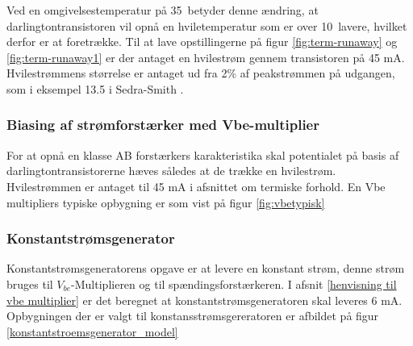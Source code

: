 Ved en omgivelsestemperatur på 35~\celsius betyder denne ændring, at darlingtontransistoren vil opnå en hviletemperatur som er over 10~\celsius lavere, hvilket derfor er at foretrække. Til at lave opstillingerne på figur \ref{fig:term-runaway} og \ref{fig:term-runaway1} er der antaget en hvilestrøm gennem transistoren på 45 mA. Hvilestrømmens størrelse er antaget ud fra 2\% af peakstrømmen på udgangen, som i eksempel 13.5 i Sedra-Smith .


\subsubsection*{Biasing af strømforstærker med Vbe-multiplier}

For at opnå en klasse AB forstærkers karakteristika skal potentialet på basis af darlingtontransistorerne hæves således at de trække en hvilestrøm. Hvilestrømmen er antaget til 45 mA i afsnittet om termiske forhold. En Vbe multipliers typiske opbygning er som vist på figur \ref{fig:vbetypisk}



\subsubsection*{Konstantstrømsgenerator}
Konstantstrømsgeneratorens opgave er at levere en konstant strøm, denne strøm bruges til $V_{be}$-Multiplieren og til spændingsforstærkeren. I afsnit \ref{henvisning til vbe multiplier} er det beregnet at konstantstrømsgeneratoren skal leveres 6 mA. Opbygningen der er valgt til konstansstrømsgereratoren er afbildet på figur \ref{konstantstroemsgenerator_model}

